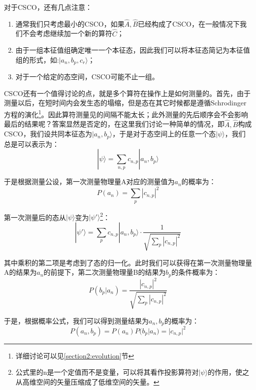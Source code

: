 对于CSCO，还有几点注意：
\begin{enumerate}
    \item 通常我们只考虑最小的CSCO，如果$\hat{A},\hat{B}$已经构成了CSCO，在一般情况下我们不会考虑继续加一个新的算符$\hat{C}$；
    \item 由于一组本征值组确定唯一一个本征态，因此我们可以将本征态简记为本征值组的形式，如:$|a_n,b_p,c_r\rangle$；
    \item 对于一个给定的态空间，CSCO可能不止一组。
\end{enumerate}

    CSCO还有一个值得讨论的点，就是多个算符在操作上是如何测量的。首先，由于测量以后，在短时间内会发生态的塌缩，但是态在其它时候都是遵循Schrodinger方程的演化\footnote{详细讨论可以见\ref{section2:evolution}节}。因此算符测量见的间隔不能太长；此外测量的先后顺序会不会影响最后的结果呢？答案显然是否定的，在这里我们讨论一种简单的情况，即$\hat{A},\hat{B}$构成CSCO，我们设共同本征态为$|a_n,b_p\rangle$，于是对于态空间上的任意一个态$|\psi\rangle$，我们总是可以表示为：
    \begin{equation}
        |\psi\rangle=\sum_{n,p}c_{n,p}|a_n,b_p\rangle
    \end{equation}
    
    于是根据测量公设，第一次测量物理量A对应的测量值为$a_n$的概率为：
    \begin{equation}
        P(a_n)=\sum_p |c_{n,p}|^2
    \end{equation}
    
    第一次测量后的态从$|\psi\rangle$变为$|\psi'\rangle$\footnote{公式里的n是一个定值而不是变量，可以将其看作投影算符对$|\psi\rangle$的作用，使之从高维空间的矢量压缩成了低维空间的矢量。}：
    \begin{equation}
        |\psi'\rangle=\sum_p c_{n,p}|a_n,b_p\rangle\cdot \frac{1}{\sqrt{\sum_p|c_{n,p}|^2}}
    \end{equation}
    
    其中乘积的第二项是考虑到了态的归一化。此时我们可以获得在第一次测量物理量A的结果为$a_n$的前提下，第二次测量物理量B的结果为$b_p$的条件概率为：
    \begin{equation}
        P(b_p|a_n)=\frac{|c_{n,p}|^2}{\sqrt{\sum_p|c_{n,p}|^2}}
    \end{equation}
    
    于是，根据概率公式，我们可以得到测量结果为$a_n,b_p$的概率为：
    \begin{equation}
        P(a_n,b_p)=P(a_n)P(b_p|a_n)=|c_{n,p}|^2
    \end{equation}
    
